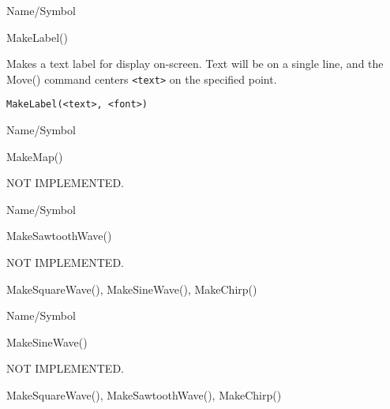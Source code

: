 \rl




\begin{desc}{Name/Symbol}
\item[Name/Symbol]	MakeLabel()

\item[Description]	Makes a text label for display on-screen. Text will be 
		on a single line, and the Move() command centers \verb+<text>+
		on the specified point.

\item[Usage]
\begin{verbatim}
MakeLabel(<text>, <font>)
\end{verbatim}

\item[Example]	

\item[See Also]	
\end{desc}

\rl




\begin{desc}{Name/Symbol}
\item[Name/Symbol]	MakeMap()

\item[Description]	NOT IMPLEMENTED.

\item[Usage]		

\item[Example]	

\item[See Also]	
\end{desc}

\rl


\begin{desc}{Name/Symbol}
\item[Name/Symbol]	MakeSawtoothWave()     

\item[Description]	NOT IMPLEMENTED.

\item[Usage]		

\item[Example]	

\item[See Also]	MakeSquareWave(), MakeSineWave(), MakeChirp()
\end{desc}

\rl


\begin{desc}{Name/Symbol}
\item[Name/Symbol]	MakeSineWave()     

\item[Description]	NOT IMPLEMENTED.

\item[Usage]		

\item[Example]	

\item[See Also]	MakeSquareWave(), MakeSawtoothWave(), MakeChirp()
\end{desc}

